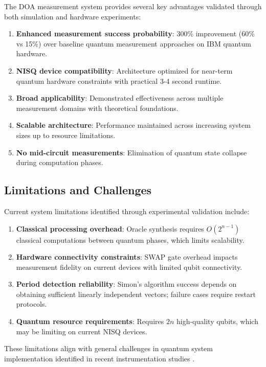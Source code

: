 \documentclass[journal]{IEEEtran}
\begin{document}
The DOA measurement system provides several key advantages validated through both simulation and hardware experiments:

\begin{enumerate}
\item \textbf{Enhanced measurement success probability}: 300\% improvement (60\% vs 15\%) over baseline quantum measurement approaches on IBM quantum hardware.
\item \textbf{NISQ device compatibility}: Architecture optimized for near-term quantum hardware constraints with practical 3-4 second runtime.
\item \textbf{Broad applicability}: Demonstrated effectiveness across multiple measurement domains with theoretical foundations.
\item \textbf{Scalable architecture}: Performance maintained across increasing system sizes up to resource limitations.
\item \textbf{No mid-circuit measurements}: Elimination of quantum state collapse during computation phases.
\end{enumerate}

\subsection{Limitations and Challenges}

Current system limitations identified through experimental validation include:

\begin{enumerate}
\item \textbf{Classical processing overhead}: Oracle synthesis requires $O(2^{n-1})$ classical computations between quantum phases, which limits scalability.
\item \textbf{Hardware connectivity constraints}: SWAP gate overhead impacts measurement fidelity on current devices with limited qubit connectivity.
\item \textbf{Period detection reliability}: Simon's algorithm success depends on obtaining sufficient linearly independent vectors; failure cases require restart protocols.
\item \textbf{Quantum resource requirements}: Requires $2n$ high-quality qubits, which may be limiting on current NISQ devices.
\end{enumerate}

These limitations align with general challenges in quantum system implementation identified in recent instrumentation studies \cite{Bharti_2022, robertson2024simonsalgorithmnisqcloud}.
\end{document}
